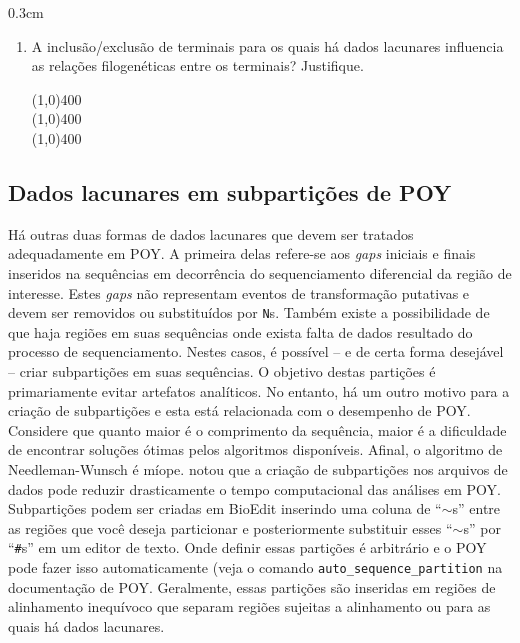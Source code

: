 \begin{refsection}
\begin {myindentpar}{0.3cm}
\begin{enumerate}[\itshape i.]
\begin{center}
\line(1,0){400}\\
\line(1,0){400}\\
\line(1,0){400}\\
\end{center}

	\item{A inclusão/exclusão de terminais para os quais há dados lacunares influencia as relações filogenéticas entre os terminais? Justifique.}

\begin{center}
\line(1,0){400}\\
\line(1,0){400}\\
\line(1,0){400}\\
\end{center}

\end{enumerate}
\end{myindentpar}

	\subsection{Dados lacunares em subpartições de POY}\label{tut11:missing:sub}

Há outras duas formas de dados lacunares que devem ser tratados adequadamente em POY. A primeira delas refere-se aos \textit{gaps} iniciais e finais inseridos na sequências em decorrência do sequenciamento diferencial da região de interesse. Estes \textit{gaps} não representam eventos de transformação putativas e devem ser removidos ou substituídos por \texttt{N}s. Também existe a possibilidade de que haja regiões em suas sequências onde exista falta de dados resultado do processo de sequenciamento. Nestes casos, é possível -- e de certa forma desejável -- criar subpartições em suas sequências. O objetivo destas partições é primariamente evitar artefatos analíticos. No entanto, há um outro motivo para a criação de subpartições e esta está relacionada com o desempenho de POY. Considere que quanto maior é o comprimento da sequência, maior é a dificuldade de encontrar soluções ótimas pelos algoritmos disponíveis. Afinal, o algoritmo de Needleman-Wunsch é míope. \textcite{Giribet_2001} notou que a criação de subpartições nos arquivos de dados pode reduzir drasticamente o tempo computacional das análises em POY. Subpartições podem ser criadas em BioEdit inserindo uma coluna de ``$\sim$s'' entre as regiões que você deseja particionar e posteriormente substituir esses ``$\sim$s'' por ``\texttt{{\#}}s'' em um editor de texto. Onde definir essas partições é arbitrário e o POY pode fazer isso automaticamente (veja o comando \texttt{auto\_sequence\_partition} na documentação de POY. Geralmente, essas partições são inseridas em regiões de alinhamento inequívoco que separam regiões sujeitas a alinhamento ou para as quais há dados lacunares.


\end{refsection}
